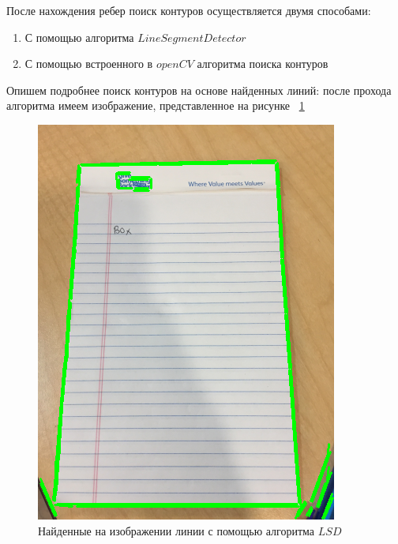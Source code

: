 После нахождения ребер поиск контуров осуществляется двумя способами:
\begin{enumerate}
    \item С помощью алгоритма $Line Segment Detector$ \cite{lsd}
    \item С помощью встроенного в $openCV$ алгоритма поиска контуров \cite{opencv_contours}
\end{enumerate}

Опишем подробнее поиск контуров на основе найденных линий: после прохода алгоритма имеем изображение, представленное на рисунке ~\ref{lsd_img}
\begin{figure}
    \includegraphics[scale=0.5]{img/perspective/lsd}
    \caption{Найденные на изображении линии с помощью алгоритма $LSD$}
    \label{lsd_img}
\end{figure}

